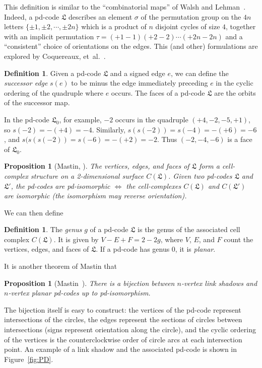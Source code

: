 \documentclass[amsmath,secnumarabic,floatfix,amssymb,nofootinbib,nobibnotes,letterpaper,11pt,tightenlines,showkeys]{revtex4}
\newtheorem{proposition}[theorem]{Proposition}
\theoremstyle{definition}
\newtheorem{definition}[theorem]{Definition}
\begin{document}
This definition is similar to the ``combinatorial maps'' of Walsh and Lehman~\cite{Walsh1972192}. Indeed, a pd-code $\mathfrak{L}$ describes an element $\sigma$ of the permutation group on the $4n$ letters $\{\pm1,\pm2,\cdots,\pm2n\}$ which is a product of $n$ disjoint cycles of size $4$, together with an implicit permutation $\tau = (+1 -1)(+2 -2)\cdots(+2n -2n)$ and a ``consistent'' choice of orientations on the edges. This (and other) formulations are explored by Coquereaux, et\ al.~\cite{Coquereaux:2015wv}.
\begin{definition}
Given a pd-code $\mathfrak{L}$ and a signed edge $e$, we can define the \emph{successor edge} $s(e)$ to be minus the edge immediately preceding $e$ in the cyclic ordering of the quadruple where $e$ occurs. The faces of a pd-code $\mathfrak{L}$ are the orbits of the successor map.
\end{definition}
In the pd-code $\mathfrak{L}_0$, for example, $-2$ occurs in the quadruple $(+4,-2,-5,+1)$, so $s(-2) = -(+4) = -4$. Similarly, $s(s(-2)) = s(-4) = -(+6) = -6$, and $s(s(s(-2)) = s(-6) = -(+2) = -2$. Thus $(-2,-4,-6)$ is a face of $\mathfrak{L}_0$.
\begin{proposition}[Mastin, \cite{Mastin:2015ii}]
The vertices, edges, and faces of $\mathfrak{L}$ form a cell-complex structure on a 2-dimensional surface $C(\mathfrak{L})$. Given two pd-codes $\mathfrak{L}$ and $\mathfrak{L'}$, the pd-codes are pd-isomorphic $\iff$ the cell-complexes $C(\mathfrak{L})$ and $C(\mathfrak{L}')$ are isomorphic (the isomorphism may reverse orientation).
\end{proposition}
We can then define
\begin{definition}
The \emph{genus} $g$ of a pd-code $\mathfrak{L}$ is the genus of the associated cell complex $C(\mathfrak{L})$. It is given by $V - E + F = 2 - 2g$, where $V$, $E$, and $F$ count the vertices, edges, and faces of $\mathfrak{L}$. If a pd-code has genus 0, it is \emph{planar}.
\end{definition}
It is another theorem of Mastin that
\begin{proposition}[Mastin~\cite{Mastin:2015ii}]
There is a bijection between $n$-vertex link shadows and $n$-vertex \emph{planar} pd-codes up to pd-isomorphism.
\end{proposition}
The bijection itself is easy to construct: the vertices of the pd-code represent intersections of the circles, the edges represent the sections of circles between intersections (signs represent orientation along the circle), and the cyclic ordering of the vertices is the counterclockwise order of circle arcs at each intersection point. An example of a link shadow and the associated pd-code is shown in Figure~\ref{fig:PD}.
\end{document}
